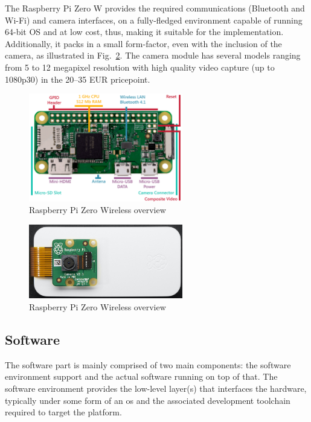 The Raspberry Pi Zero W provides the required communications
(Bluetooth and Wi-Fi) and camera interfaces, on a fully-fledged environment
capable of running 64-bit OS and at low cost, thus, making it
suitable for the implementation. Additionally, it packs in a small form-factor,
even with the inclusion of the camera, as illustrated in
Fig.~\ref{fig:pi-zero-w-cam}. The camera module has several models ranging from
5 to 12 megapixel resolution with high quality video capture (up to 1080p30) in
the 20--35 EUR pricepoint.
%
\begin{figure}[!hbt]
\centering
    \includegraphics[width=0.6\textwidth]{./img/pi-zero-w.png}
  \caption{Raspberry Pi Zero Wireless overview}%
\label{fig:pi-zero-w}
\end{figure}
\begin{figure}[!hbt]
\centering
    \includegraphics[width=0.6\textwidth]{./img/pi-zero-w-cam.jpg}
  \caption{Raspberry Pi Zero Wireless overview}%
\label{fig:pi-zero-w-cam}
\end{figure}
%
%
\subsection{Software}%
\label{sec:software-rvvs-implem}
The software part is mainly comprised of two main components: the software
environment support and the actual software running on top of that. The software
environment provides the low-level layer(s) that interfaces the hardware,
typically under some form of an \gls{os} and the associated development
toolchain required to target the platform.

